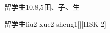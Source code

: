 \begin{entry}{留学生}{10,8,5}{⽥、⼦、⽣}
  \begin{phonetics}{留学生}{liu2 xue2 sheng1}[][HSK 2]
  \end{phonetics}
\end{entry}
